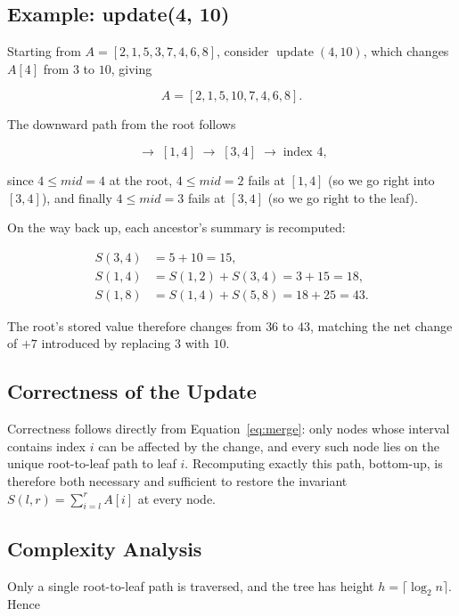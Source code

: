 \documentclass[11pt]{article}
\begin{document}
\subsection{Example: update(4, 10)}
Starting from $A = [2,1,5,3,7,4,6,8]$, consider $\operatorname{update}(4,10)$, which changes $A[4]$ from $3$ to $10$, giving

\begin{equation}
A = [2,1,5,10,7,4,6,8].
\end{equation}

The downward path from the root follows

\begin{equation}
[1,8] \;\rightarrow\; [1,4] \;\rightarrow\; [3,4] \;\rightarrow\; \text{index } 4,
\end{equation}

since $4 \le mid = 4$ at the root, $4 \le mid = 2$ fails at $[1,4]$ (so we go right into $[3,4]$), and finally $4 \le mid = 3$ fails at $[3,4]$ (so we go right to the leaf).

On the way back up, each ancestor's summary is recomputed:

\begin{align}
S(3,4) &= 5 + 10 = 15, \\
S(1,4) &= S(1,2) + S(3,4) = 3 + 15 = 18, \\
S(1,8) &= S(1,4) + S(5,8) = 18 + 25 = 43.
\end{align}

The root's stored value therefore changes from $36$ to $43$, matching the net change of $+7$ introduced by replacing $3$ with $10$.

\subsection{Correctness of the Update}
Correctness follows directly from Equation~\eqref{eq:merge}: only nodes whose interval contains index $i$ can be affected by the change, and every such node lies on the unique root-to-leaf path to leaf $i$. Recomputing exactly this path, bottom-up, is therefore both necessary and sufficient to restore the invariant $S(l,r) = \sum_{i=l}^r A[i]$ at every node.

\subsection{Complexity Analysis}
Only a single root-to-leaf path is traversed, and the tree has height $h = \lceil \log_2 n \rceil$. Hence
\end{document}
